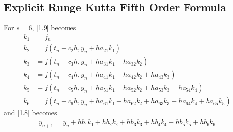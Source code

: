 \documentclass[a4paper,oneside]{book}
\numberwithin{equation}{chapter}
\begin{document}
\subsection{Explicit Runge Kutta Fifth Order Formula}
For $s=6$, \eqref{1.9} becomes
\begin{align}
{k_1} &= {f_n}\\
{k_2} &= f\left( {{t_n} + {c_2}h,{y_n} + h{a_{21}}{k_1}} \right)\\
{k_3} &= f\left( {{t_n} + {c_3}h,{y_n} + h{a_{31}}{k_1} + h{a_{32}}{k_2}} \right)\\
{k_4} &= f\left( {{t_n} + {c_4}h,{y_n} + h{a_{41}}{k_1} + h{a_{42}}{k_2} + h{a_{43}}{k_3}} \right)\\
{k_5} &= f\left( {{t_n} + {c_5}h,{y_n} + h{a_{51}}{k_1} + h{a_{52}}{k_2} + h{a_{53}}{k_3} + h{a_{54}}{k_4}} \right)\\
{k_6} &= f\left( {{t_n} + {c_6}h,{y_n} + h{a_{61}}{k_1} + h{a_{62}}{k_2} + h{a_{63}}{k_3} + h{a_{64}}{k_4} + h{a_{65}}{k_5}} \right)
\end{align}
and \eqref{1.8} becomes
\begin{align}
{{y_{n + 1}}} = {{y_n}} + h{b_1}{k_1} + h{b_2}{k_2} + h{b_3}{k_3} + h{b_4}{k_4} + h{b_5}{k_5} + h{b_6}{k_6}
\end{align}
\end{document}
